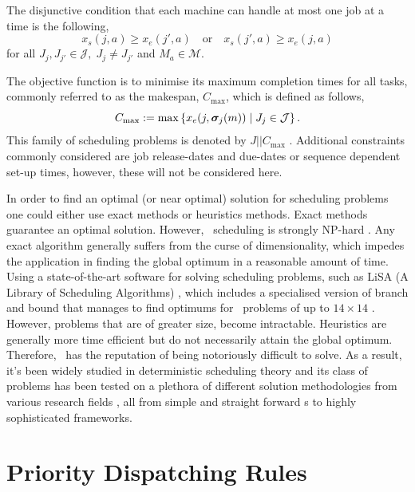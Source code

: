 \documentclass[smallextended]{svjour3}
\begin{document}
The disjunctive condition that each machine can handle at most one job at a 
time is the following,
\begin{equation}\label{eq:oneJobPerMac}
x_s(j,a) \geq x_e(j',a) \quad\textrm{or}\quad x_s(j',a) \geq x_e(j,a)  
\end{equation}
for all $J_j,J_{j'}\in\mathcal{J},\; J_j\neq J_{j'}$ and $M_a\in\mathcal{M}$. 

The objective function is to minimise its maximum completion times for all 
tasks, commonly referred to as the makespan, $C_{\max}$, which is defined as 
follows,
\begin{equation}
C_{\max} := 
\max\left\{x_e(j,\bm \sigma_j(m))\;\middle|\;J_j\in\mathcal{J}\right\}.\label{eq:makespan}
\end{equation} 
This family of scheduling problems is denoted by $J||C_{\max}$ 
\cite{Pinedo08}.
Additional constraints commonly considered are job release-dates and due-dates 
or sequence dependent set-up times, however, these will not be considered here. 

In order to find an optimal (or near optimal) solution for scheduling problems 
one could either use exact methods or heuristics methods. Exact methods 
guarantee an optimal solution. However, \jsp\ scheduling is strongly NP-hard 
\cite{Garey76:NPhard}. Any exact algorithm generally suffers from the curse of 
dimensionality, which impedes the application in finding the global optimum in 
a reasonable amount of time. 
Using a state-of-the-art software for solving scheduling problems, such as 
LiSA %
(A Library of Scheduling Algorithms) \cite{LiSA}, which includes a specialised 
version of branch and bound that manages to find optimums for \jsp\ problems of 
up to $14\times14$ \cite{Ru12}. However, problems that are of greater size, 
become intractable. 
Heuristics are generally more time efficient but 
do not necessarily attain the global optimum. Therefore, \jsp\ has the 
reputation of being notoriously difficult to solve. 
As a result, it's been widely studied in deterministic scheduling theory and 
its class of problems has been tested on a plethora of different solution 
methodologies from various research fields \cite{Meeran12}, all from simple and 
straight forward \dr s to highly sophisticated frameworks.


\section{Priority Dispatching Rules} \label{sec:DR}
\end{document}
